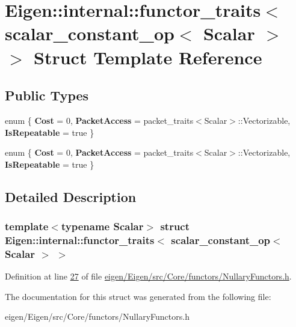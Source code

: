 \hypertarget{struct_eigen_1_1internal_1_1functor__traits_3_01scalar__constant__op_3_01_scalar_01_4_01_4}{}\section{Eigen\+:\+:internal\+:\+:functor\+\_\+traits$<$ scalar\+\_\+constant\+\_\+op$<$ Scalar $>$ $>$ Struct Template Reference}
\label{struct_eigen_1_1internal_1_1functor__traits_3_01scalar__constant__op_3_01_scalar_01_4_01_4}
\subsection*{Public Types}
\begin{DoxyCompactItemize}
\item 
\mbox{\label{struct_eigen_1_1internal_1_1functor__traits_3_01scalar__constant__op_3_01_scalar_01_4_01_4_a629658eddb9ce1d272f6a9529f0bb507}} 
enum \{ {\bfseries Cost} = 0, 
{\bfseries Packet\+Access} = packet\+\_\+traits$<$Scalar$>$\+:\+:Vectorizable, 
{\bfseries Is\+Repeatable} = true
 \}
\item 
\mbox{\label{struct_eigen_1_1internal_1_1functor__traits_3_01scalar__constant__op_3_01_scalar_01_4_01_4_a3b944a4b1343d763c4993a73d1b53339}} 
enum \{ {\bfseries Cost} = 0, 
{\bfseries Packet\+Access} = packet\+\_\+traits$<$Scalar$>$\+:\+:Vectorizable, 
{\bfseries Is\+Repeatable} = true
 \}
\end{DoxyCompactItemize}


\subsection{Detailed Description}
\subsubsection*{template$<$typename Scalar$>$\newline
struct Eigen\+::internal\+::functor\+\_\+traits$<$ scalar\+\_\+constant\+\_\+op$<$ Scalar $>$ $>$}



Definition at line \hyperlink{eigen_2_eigen_2src_2_core_2functors_2_nullary_functors_8h_source_l00027}{27} of file \hyperlink{eigen_2_eigen_2src_2_core_2functors_2_nullary_functors_8h_source}{eigen/\+Eigen/src/\+Core/functors/\+Nullary\+Functors.\+h}.



The documentation for this struct was generated from the following file\+:\begin{DoxyCompactItemize}
\item 
eigen/\+Eigen/src/\+Core/functors/\+Nullary\+Functors.\+h\end{DoxyCompactItemize}
